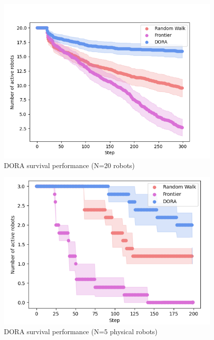 \begin{figure}
    \includegraphics[width=16cm]{figures/dora_explorer/activerobots_20.png}
        \caption[DORA survival performance (N=20 robots)]{DORA survival performance (N=20 robots)}
        \label{results:failures20}
\end{figure}

\begin{figure}
    \includegraphics[width=16cm]{figures/dora_explorer/activerobots_real.png}
        \caption[DORA survival performance (N=5 physical robots)]{DORA survival performance (N=5 physical robots)}
        \label{results:active_robots_physical}
\end{figure}

